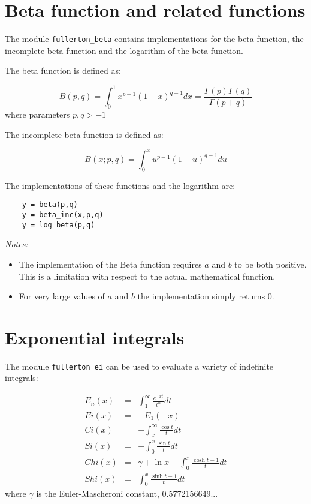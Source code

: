 \documentclass{article}
\begin{document}
\section{Beta function and related functions}
The module \verb+fullerton_beta+ contains implementations for the beta function, the incomplete beta function
and the logarithm of the beta function.

The beta function is defined as:

\begin{equation}
    B(p,q) = \int_0^1 x^{p-1} (1 - x)^{q-1} dx = \frac{\Gamma(p)\Gamma(q)}{\Gamma(p+q)}
\end{equation}
\noindent where parameters $p, q > -1$

The incomplete beta function is defined as:

\begin{equation}
    B(x;p,q) = \int_0^x u^{p-1} (1 - u)^{q-1} du
\end{equation}

The implementations of these functions and the logarithm are:

\begin{verbatim}
    y = beta(p,q)
    y = beta_inc(x,p,q)
    y = log_beta(p,q)
\end{verbatim}

\emph{Notes:}
\begin{itemize}
\item
The implementation of the Beta function requires $a$ and $b$ to be both positive. This is a limitation with
respect to the actual mathematical function.
\item
For very large values of $a$ and $b$ the implementation simply returns 0.
\end{itemize}


\section{Exponential integrals}
The module \verb+fullerton_ei+ can be used to evaluate a variety of indefinite integrals:

\begin{eqnarray}
    E_n(x) &=& \int^\infty_1 \frac{e^{-xt}}{t^n} dt              \\
    Ei(x)  &=& -E_1(-x)                                          \\
    Ci(x)  &=& -\int^\infty_x \frac{\cos t}{t} dt                \\
    Si(x)  &=& -\int^x_0 \frac{\sin t}{t} dt                     \\
    Chi(x) &=& \gamma + \ln x + \int^x_0 \frac{\cosh t -1}{t} dt \\
    Shi(x) &=& \int^x_0 \frac{\sinh t -1}{t} dt
\end{eqnarray}
\noindent where $\gamma$ is the Euler-Mascheroni constant, 0.5772156649...
\end{document}
